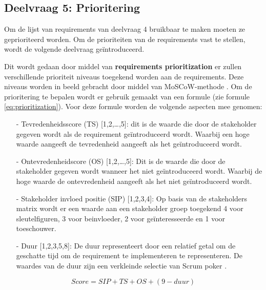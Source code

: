 \subsection{Deelvraag 5: Prioritering}
Om de lijst van requirements van deelvraag 4 bruikbaar te maken moeten ze geprioriteerd worden.
Om de prioriteiten van de requirements vast te stellen, wordt de volgende deelvraag geïntroduceerd.

\begin{center}
	\textit{\SubquestionFive}
\end{center}

\whitespace[0.2]
Dit wordt gedaan door middel van \textbf{requirements prioritization} er zullen verschillende prioriteit niveaus toegekend worden aan de requirements.
Deze niveaus worden in beeld gebracht door middel van MoSCoW-methode \Parencite{MoSCoW}.
Om de prioritering te bepalen wordt er gebruik gemaakt van een formule (zie formule \ref{eq:prioritization}).
Voor deze formule worden de volgende aspecten mee genomen:
\begin{enumerate}
	\item[-] Tevredenheidsscore (TS) [1,2,\ldots,5]: dit is de waarde die door de stakeholder gegeven wordt als de requirement geïntroduceerd wordt.
        Waarbij een hoge waarde aangeeft de tevredenheid aangeeft als het geïntroduceerd wordt.
	\item[-] Ontevredenheidscore (OS) [1,2,\dots,5]: Dit is de waarde die door de stakeholder gegeven wordt wanneer het niet geïntroduceerd wordt.
        Waarbij de hoge waarde de ontevredenheid aangeeft als het niet geïntroduceerd wordt.
	\item[-] Stakeholder invloed positie (SIP) [1,2,3,4]: Op basis van de stakeholders matrix wordt er een waarde aan een stakeholder groep toegekend 4 voor sleutelfiguren, 3 voor beinvloeder, 2 voor geïnteresseerde en 1 voor toeschouwer.
	\item[-] Duur [1,2,3,5,8]: De duur representeert door een relatief getal om de geschatte tijd om de requirement te implementeren te representeren.
	      De waardes van de duur zijn een verkleinde selectie van Scrum poker \Parencite{ScrumPoker}.
\end{enumerate}

\whitespace
\begin{equation}
	\label{eq:prioritization}
	Score = SIP + TS + OS + (9 - duur)
\end{equation}

